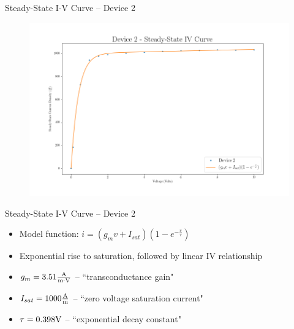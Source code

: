 \documentclass{beamer}
\begin{document}
\begin{frame}{Steady-State I-V Curve -- Device 2}
    \begin{figure}
        \centering
        \includegraphics[scale=0.35]{Figures/Device_2/SteadyState_Fit.png}
        \label{fig:dev2_ss}
    \end{figure}
\end{frame}

\begin{frame}{Steady-State I-V Curve -- Device 2}
    \begin{itemize}
        \item Model function: $ i = \left( g_m v + I_{sat} \right) \left( 1 - e^{-\frac{v}{\tau}} \right) $
        \item Exponential rise to saturation, followed by linear IV relationship
        \item $g_m = 3.51 \frac{\textnormal{A}}{\textnormal{m} \cdot \textnormal{V}}$ -- ``transconductance gain" 
        \item $I_{sat} = 1000 \frac{\textnormal{A}}{\textnormal{m}}$ -- ``zero voltage saturation current"
        \item $\tau = 0.398 \textnormal{V}$ -- ``exponential decay constant"
    \end{itemize}
\end{frame}
\end{document}

